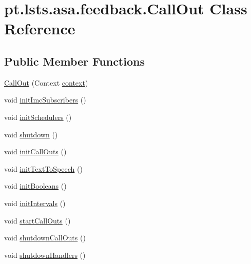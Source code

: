 \hypertarget{classpt_1_1lsts_1_1asa_1_1feedback_1_1CallOut}{}\section{pt.\+lsts.\+asa.\+feedback.\+Call\+Out Class Reference}
\label{classpt_1_1lsts_1_1asa_1_1feedback_1_1CallOut}
\subsection*{Public Member Functions}
\begin{DoxyCompactItemize}
\item 
\hyperlink{classpt_1_1lsts_1_1asa_1_1feedback_1_1CallOut_a632cf1b51f5e5fa9d8675e136f874b5e}{Call\+Out} (Context \hyperlink{classpt_1_1lsts_1_1asa_1_1feedback_1_1CallOut_ae2847d0ea493a1763d4928c06fd19090}{context})
\item 
void \hyperlink{classpt_1_1lsts_1_1asa_1_1feedback_1_1CallOut_a878d2c0daf5c7ed7b65611bcb09e6276}{init\+Imc\+Subscribers} ()
\item 
void \hyperlink{classpt_1_1lsts_1_1asa_1_1feedback_1_1CallOut_af9a5d03a2a607dd69e442858d256d40e}{init\+Schedulers} ()
\item 
void \hyperlink{classpt_1_1lsts_1_1asa_1_1feedback_1_1CallOut_a3a3c3ef6adead2421a11b75215839ddf}{shutdown} ()
\item 
void \hyperlink{classpt_1_1lsts_1_1asa_1_1feedback_1_1CallOut_a78be353e81440e6d5aaf1cc4df912797}{init\+Call\+Outs} ()
\item 
void \hyperlink{classpt_1_1lsts_1_1asa_1_1feedback_1_1CallOut_afc78c22734786bae0d74575883687e61}{init\+Text\+To\+Speech} ()
\item 
void \hyperlink{classpt_1_1lsts_1_1asa_1_1feedback_1_1CallOut_a58d663ee1cbb9bed807693d1d956819d}{init\+Booleans} ()
\item 
void \hyperlink{classpt_1_1lsts_1_1asa_1_1feedback_1_1CallOut_a17720d24e216d03136739c8344bbe3ed}{init\+Intervals} ()
\item 
void \hyperlink{classpt_1_1lsts_1_1asa_1_1feedback_1_1CallOut_a5f24b430c5f26736f04ab4a3b70128f1}{start\+Call\+Outs} ()
\item 
void \hyperlink{classpt_1_1lsts_1_1asa_1_1feedback_1_1CallOut_a1b1f66dcffb4bd73d8f40366fed21bbd}{shutdown\+Call\+Outs} ()
\item 
void \hyperlink{classpt_1_1lsts_1_1asa_1_1feedback_1_1CallOut_aec046fc22274094c8b9e52a6556f6d1c}{shutdown\+Handlers} ()

\end{DoxyCompactItemize}
